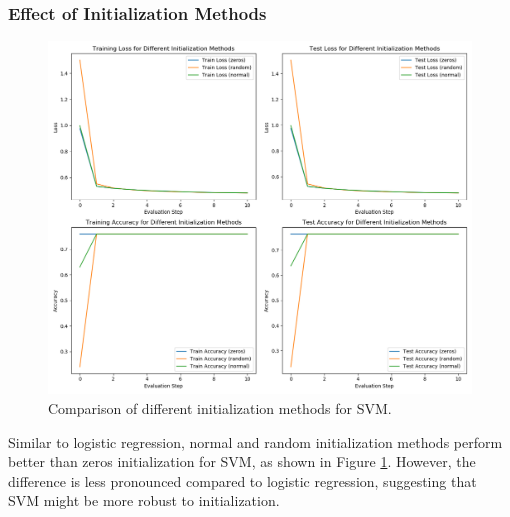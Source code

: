 \documentclass[journal, a4paper]{IEEEtran}
\begin{document}
\subsubsection{Effect of Initialization Methods}
\begin{figure}[htbp]
\centering
\includegraphics[width=\linewidth]{svm_init_methods.png}
\caption{Comparison of different initialization methods for SVM.}
\label{fig:svm_init}
\end{figure}

Similar to logistic regression, normal and random initialization methods perform better than zeros initialization for SVM, as shown in Figure \ref{fig:svm_init}. However, the difference is less pronounced compared to logistic regression, suggesting that SVM might be more robust to initialization.
\end{document}
